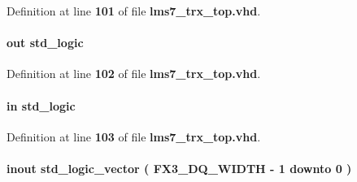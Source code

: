 Definition at line {\bf 101} of file {\bf lms7\+\_\+trx\+\_\+top.\+vhd}.

\paragraph[{F\+X3\+\_\+\+C\+T\+L7}]{ {\bfseries \textcolor{keywordflow}{out}\textcolor{vhdlchar}{ }} {\bfseries \textcolor{comment}{std\+\_\+logic}\textcolor{vhdlchar}{ }} \hspace{0.3cm}{\ttfamily [Port]}}\label{classlms7__trx__top_aba0b3309d64245cba3c3b09d06ab7074}


Definition at line {\bf 102} of file {\bf lms7\+\_\+trx\+\_\+top.\+vhd}.

\paragraph[{F\+X3\+\_\+\+C\+T\+L8}]{ {\bfseries \textcolor{keywordflow}{in}\textcolor{vhdlchar}{ }} {\bfseries \textcolor{comment}{std\+\_\+logic}\textcolor{vhdlchar}{ }} \hspace{0.3cm}{\ttfamily [Port]}}\label{classlms7__trx__top_ab06d06bd93241bd67bd41c8b74237616}


Definition at line {\bf 103} of file {\bf lms7\+\_\+trx\+\_\+top.\+vhd}.

\paragraph[{F\+X3\+\_\+\+DQ}]{ {\bfseries \textcolor{keywordflow}{inout}\textcolor{vhdlchar}{ }} {\bfseries \textcolor{comment}{std\+\_\+logic\+\_\+vector}\textcolor{vhdlchar}{ }\textcolor{vhdlchar}{(}\textcolor{vhdlchar}{ }\textcolor{vhdlchar}{ }\textcolor{vhdlchar}{ }\textcolor{vhdlchar}{ }{\bfseries {\bf F\+X3\+\_\+\+D\+Q\+\_\+\+W\+I\+D\+TH}} \textcolor{vhdlchar}{-\/}\textcolor{vhdlchar}{ } \textcolor{vhdldigit}{1} \textcolor{vhdlchar}{ }\textcolor{keywordflow}{downto}\textcolor{vhdlchar}{ }\textcolor{vhdlchar}{ } \textcolor{vhdldigit}{0} \textcolor{vhdlchar}{ }\textcolor{vhdlchar}{)}\textcolor{vhdlchar}{ }} \hspace{0.3cm}{\ttfamily [Port]}}\label{classlms7__trx__top_af58a6dc90583a89d0a8d2a968a8f2db8}


